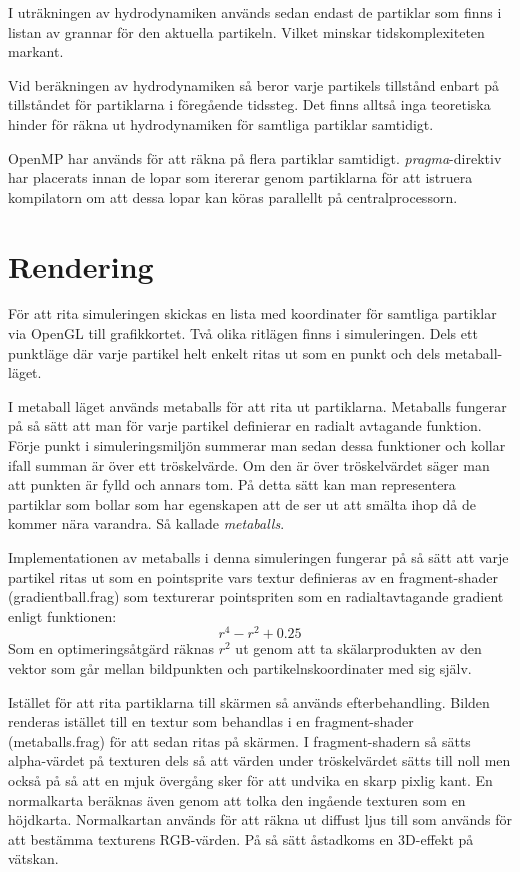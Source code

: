 \documentclass[a4paper,12pt,oneside,final]{extarticle}
\begin{document}
I uträkningen av hydrodynamiken används sedan endast de partiklar som finns i listan av grannar för den aktuella partikeln.
Vilket minskar tidskomplexiteten markant.

Vid beräkningen av hydrodynamiken så beror varje partikels tillstånd enbart på tillståndet för partiklarna i föregående tidssteg.
Det finns alltså inga teoretiska hinder för räkna ut hydrodynamiken för samtliga partiklar samtidigt.

OpenMP \cite{openmp} har används för att räkna på flera partiklar samtidigt.
\textit{pragma}-direktiv har placerats innan de lopar som itererar genom partiklarna för att istruera kompilatorn om att dessa lopar kan köras parallellt på centralprocessorn.

\section{Rendering}
För att rita simuleringen skickas en lista med koordinater för samtliga partiklar via OpenGL till grafikkortet.
Två olika ritlägen finns i simuleringen.
Dels ett punktläge där varje partikel helt enkelt ritas ut som en punkt och dels metaball-läget.

I metaball läget används metaballs för att rita ut partiklarna.
Metaballs fungerar på så sätt att man för varje partikel definierar en radialt avtagande funktion.
Förje punkt i simuleringsmiljön summerar man sedan dessa funktioner och kollar ifall summan är över ett tröskelvärde.
Om den är över tröskelvärdet säger man att punkten är fylld och annars tom.
På detta sätt kan man representera partiklar som bollar som har egenskapen att de ser ut att smälta ihop då de kommer nära varandra.
Så kallade \textit{metaballs}.

Implementationen av metaballs i denna simuleringen fungerar på så sätt att varje partikel ritas ut som en pointsprite vars textur definieras av en fragment-shader (gradientball.frag) som texturerar pointspriten som en radialtavtagande gradient enligt funktionen:
\begin{equation}
r^{4} -r^{2} + 0.25
\end{equation}
Som en optimeringsåtgärd räknas $ r^{2} $ ut genom att ta skälarprodukten av den vektor som går mellan bildpunkten och partikelnskoordinater med sig själv.

Istället för att rita partiklarna till skärmen så används efterbehandling.
Bilden renderas istället till en textur som behandlas i en fragment-shader (metaballs.frag) för att sedan ritas på skärmen.
I fragment-shadern så sätts alpha-värdet på texturen dels så att värden under tröskelvärdet sätts till noll men också på så att en mjuk övergång sker för att undvika en skarp pixlig kant.
En normalkarta beräknas även genom att tolka den ingående texturen som en höjdkarta.
Normalkartan används för att räkna ut diffust ljus till som används för att bestämma texturens RGB-värden.
På så sätt åstadkoms en 3D-effekt på vätskan.
\clearpage
\end{document}
